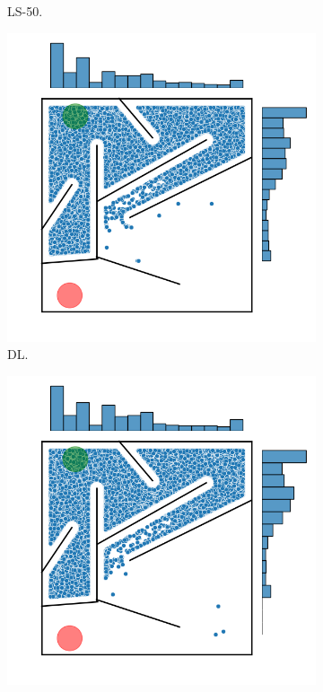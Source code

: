 \begin{figure}[H]
\begin{mdframed}
\begin{subfigure}[t]{0.5\textwidth}
            \caption{LS-50.}
        \end{subfigure}
        \begin{subfigure}[t]{0.5\textwidth}
            \includegraphics[scale=0.4]{resources/mazes/dynamic_hard_all.png}
            \caption{DL.}
        \end{subfigure}
        \begin{subfigure}[t]{0.5\textwidth}
            \includegraphics[scale=0.4]{resources/mazes/novelty_injection_hard_all.png}

\end{subfigure}
\end{mdframed}
\end{figure}

